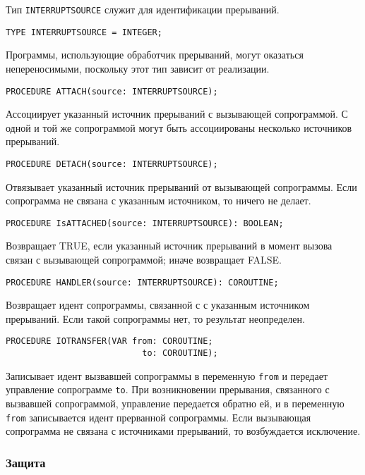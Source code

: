 Тип {\tt INTERRUPTSOURCE} служит для идентификации прерываний.
\begin{verbatim}
TYPE INTERRUPTSOURCE = INTEGER;
\end{verbatim}
Программы, использующие обработчик прерываний, могут оказаться
непереносимыми, поскольку этот тип зависит от реализации.

\begin{verbatim}
PROCEDURE ATTACH(source: INTERRUPTSOURCE);
\end{verbatim}
Ассоциирует указанный источник прерываний с вызывающей сопрограммой.
С одной и той же сопрограммой могут быть ассоциированы несколько 
источников прерываний.

\begin{verbatim}
PROCEDURE DETACH(source: INTERRUPTSOURCE);
\end{verbatim}
Отвязывает указанный источник прерываний от вызывающей сопрограммы.
Если сопрограмма не связана с указанным источником, то ничего не делает.

\begin{verbatim}
PROCEDURE IsATTACHED(source: INTERRUPTSOURCE): BOOLEAN;
\end{verbatim}
Возвращает TRUE, если указанный источник прерываний 
в момент вызова связан с вызывающей сопрограммой; иначе
возвращает FALSE.

\begin{verbatim}
PROCEDURE HANDLER(source: INTERRUPTSOURCE): COROUTINE;
\end{verbatim}
Возвращает идент сопрограммы, связанной с с указанным источником
прерываний. Если такой сопрограммы нет, то результат неопределен.

\begin{verbatim}
PROCEDURE IOTRANSFER(VAR from: COROUTINE;
                           to: COROUTINE);
\end{verbatim}

Записывает идент вызвавшей сопрограммы в переменную 
{\tt from}
и передает управление сопрограмме
{\tt to}. При возникновении прерывания, связанного с вызвавшей сопрограммой,
управление передается обратно ей, 
и в переменную {\tt from} записывается идент прерванной сопрограммы.
Если вызывающая сопрограмма не связана с источниками прерываний, то
возбуждается исключение.

\subsubsection{Защита}\label{m2:ISO:coroutines:prot}

